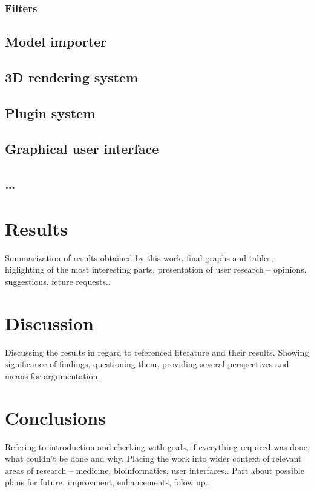 \subsection{Filters}
\section{Model importer}
\section{3D rendering system}
\section{Plugin system}
\section{Graphical user interface}
\section{\ldots}
\chapter{Results}
Summarization of results obtained by this work, final graphs and tables,
higlighting of the most interesting parts, presentation of user 
research -- opinions, suggestions,
feture requests..
\chapter{Discussion}
Discussing the results in regard to referenced literature and their results.
Showing significance of findings, questioning them, providing several
perspectives and means for argumentation.
\chapter{Conclusions}
Refering to introduction and checking with goals, if everything required was
done, what couldn't be done and why. Placing the work into wider context of
relevant areas of research -- medicine, bioinformatics, user interfaces..
Part about possible plans for future, improvment, enhancements, folow up..
